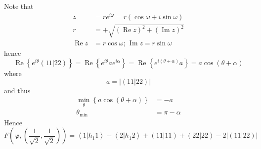 \documentclass[aps,preprint]{revtex4}%
\begin{document}
Note that
\begin{align*}
z  & =re^{i\omega}=r\left(  \cos\omega+i\sin\omega\right)  \\
r  & =+\sqrt{\left(  \operatorname{Re}z\right)  ^{2}+\left(  \operatorname{Im}%
z\right)  ^{2}}\\
\operatorname{Re}z  & =r\cos\omega;\,\operatorname{Im}z=r\sin\omega
\end{align*}
hence
\[
\operatorname{Re}\left\{  e^{i\theta}\left(  \left.  11\right\vert 22\right)
\right\}  =\operatorname{Re}\left\{  e^{i\theta}ae^{i\alpha}\right\}
=\operatorname{Re}\left\{  e^{i\left(  \theta+\alpha\right)  }a\right\}
=a\cos\left(  \theta+\alpha\right)
\]
where
\[
a=\left\vert \left(  \left.  11\right\vert 22\right)  \right\vert
\]
and thus
\begin{align*}
\min_{\theta}\left\{  a\cos\left(  \theta+\alpha\right)  \right\}    & =-a\\
\theta_{\min}  & =\pi-\alpha
\end{align*}
Hence
\[
F\left(  \mathbf{\varphi,}\left(  \frac{1}{\sqrt{2}},\frac{1}{\sqrt{2}%
}\right)  \right)  =\left\langle 1\left\vert h_{1}1\right.  \right\rangle
+\left\langle 2\left\vert h_{1}2\right.  \right\rangle +\left(  \left.
11\right\vert 11\right)  +\left(  \left.  22\right\vert 22\right)
-2\left\vert \left(  \left.  11\right\vert 22\right)  \right\vert
\]
\end{document}

